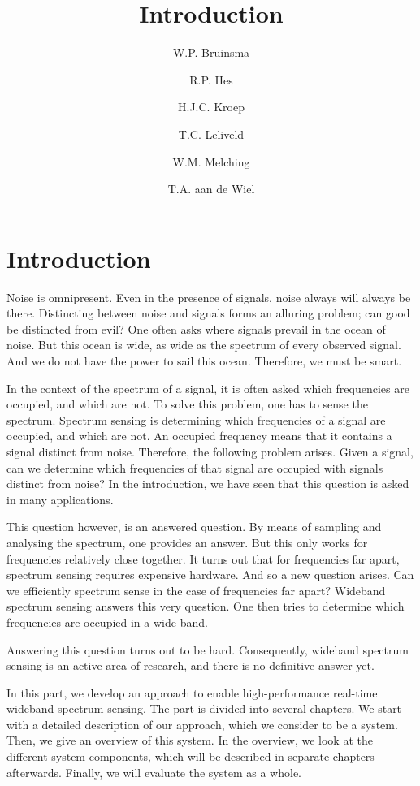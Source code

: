 \documentclass[a4paper, openany, oneside]{memoir}
\title{Introduction}
\author{W.P. Bruinsma \and R.P. Hes \and H.J.C. Kroep \and T.C. Leliveld \and W.M. Melching \and T.A. aan de Wiel}
\begin{document}
\chapter{Introduction}
Noise is omnipresent. Even in the presence of signals, noise always will always be there. Distincting between noise and signals forms an alluring problem; can good be distincted from evil? One often asks where signals prevail in the ocean of noise. But this ocean is wide, as wide as the spectrum of every observed signal. And we do not have the power to sail this ocean. Therefore, we must be smart.

In the context of the spectrum of a signal, it is often asked which frequencies are occupied, and which are not. To solve this problem, one has to sense the spectrum. Spectrum sensing is determining which frequencies of a signal are occupied, and which are not. An occupied frequency means that it contains a signal distinct from noise. Therefore, the following problem arises. Given a signal, can we determine which frequencies of that signal are occupied with signals distinct from noise? In the introduction, we have seen that this question is asked in many applications.

This question however, is an answered question. By means of sampling and analysing the spectrum, one provides an answer. But this only works for frequencies relatively close together. It turns out that for frequencies far apart, spectrum sensing requires expensive hardware. And so a new question arises. Can we efficiently spectrum sense in the case of frequencies far apart? Wideband spectrum sensing answers this very question. One then tries to determine which frequencies are occupied in a wide band.

Answering this question turns out to be hard. Consequently, wideband spectrum sensing is an active area of research, and there is no definitive answer yet.

In this part, we develop an approach to enable high-performance real-time wideband spectrum sensing. The part is divided into several chapters. We start with a detailed description of our approach, which we consider to be a system. Then, we give an overview of this system. In the overview, we look at the different system components, which will be described in separate chapters afterwards. Finally, we will evaluate the system as a whole.
\end{document}
